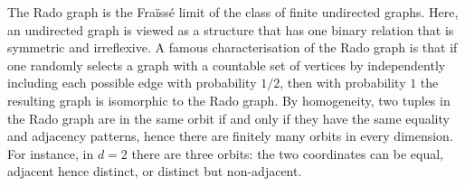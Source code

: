 \begin{myexample}\label{ex:rado-graph} The Rado graph is the Fraïssé limit of the class of finite undirected graphs. Here, an undirected graph is viewed as a structure that has one binary relation that is symmetric and irreflexive. 
A famous characterisation of the Rado graph is that if one randomly selects a graph with a countable set of vertices by independently including each possible edge with probability $1/2$, then with probability $1$ the resulting graph is isomorphic to the Rado graph. By homogeneity, two tuples in the Rado graph  are in the same orbit if and only if they have the same equality and adjacency patterns, hence there are finitely many orbits in every dimension.
For instance, in $d = 2$ there are three orbits:
the two coordinates can be equal, adjacent hence distinct, or distinct but non-adjacent.
\end{myexample}

